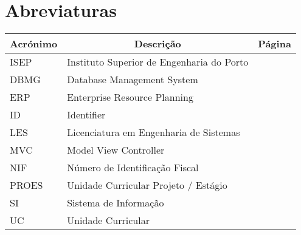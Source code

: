 

\chapter[Abreviaturas]{Abreviaturas}

\begin{center}
\small
\begin{longtable}{lp{3.0in}c}
\toprule \multicolumn{1}{c}{Acrónimo} 
                & \multicolumn{1}{c}{Descrição}
                                & \multicolumn{1}{c}{Página}\\ \midrule\addlinespace[2pt] \endhead

\bottomrule\endfoot

ISEP	& Instituto Superior de Engenharia do Porto	& \\
DBMG	& Database Management System				& \pageref{sym:DBMS}\\
ERP		& Enterprise Resource Planning				& \pageref{sym:ERP}\\
ID		& Identifier								& \pageref{sym:ID}\\
LES		& Licenciatura em Engenharia de Sistemas	& \pageref{sym:LES}\\
MVC		& Model View Controller						& \pageref{sym:MVC}\\
NIF		& Número de Identificação Fiscal			& \pageref{sym:NIF}\\
PROES	& Unidade Curricular Projeto / Estágio		& \pageref{sym:PROES}\\
SI		& Sistema de Informação						& \pageref{sym:SI}\\
UC		& Unidade Curricular						& \pageref{sym:UC}\\


\end{longtable}

\end{center}

